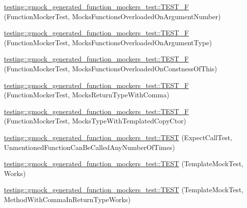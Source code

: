 \begin{DoxyCompactItemize}
\item 
\mbox{\hyperlink{namespacetesting_1_1gmock__generated__function__mockers__test_a23b4f6d7bf9f6b35126ee137aa48ae3b}{testing\+::gmock\+\_\+generated\+\_\+function\+\_\+mockers\+\_\+test\+::\+T\+E\+S\+T\+\_\+F}} (Function\+Mocker\+Test, Mocks\+Functions\+Overloaded\+On\+Argument\+Number)
\item 
\mbox{\hyperlink{namespacetesting_1_1gmock__generated__function__mockers__test_a6fb9a5901e2d2066a9fe5a3d05c0cbe1}{testing\+::gmock\+\_\+generated\+\_\+function\+\_\+mockers\+\_\+test\+::\+T\+E\+S\+T\+\_\+F}} (Function\+Mocker\+Test, Mocks\+Functions\+Overloaded\+On\+Argument\+Type)
\item 
\mbox{\hyperlink{namespacetesting_1_1gmock__generated__function__mockers__test_ad580a4b2f97b3c2643794a627b347511}{testing\+::gmock\+\_\+generated\+\_\+function\+\_\+mockers\+\_\+test\+::\+T\+E\+S\+T\+\_\+F}} (Function\+Mocker\+Test, Mocks\+Functions\+Overloaded\+On\+Constness\+Of\+This)
\item 
\mbox{\hyperlink{namespacetesting_1_1gmock__generated__function__mockers__test_abb74ac8e211661c0d87c902f87002e6d}{testing\+::gmock\+\_\+generated\+\_\+function\+\_\+mockers\+\_\+test\+::\+T\+E\+S\+T\+\_\+F}} (Function\+Mocker\+Test, Mocks\+Return\+Type\+With\+Comma)
\item 
\mbox{\hyperlink{namespacetesting_1_1gmock__generated__function__mockers__test_aa2f918da5d179b4ef678cb803456c7d3}{testing\+::gmock\+\_\+generated\+\_\+function\+\_\+mockers\+\_\+test\+::\+T\+E\+S\+T\+\_\+F}} (Function\+Mocker\+Test, Mocks\+Type\+With\+Templated\+Copy\+Ctor)
\item 
\mbox{\hyperlink{namespacetesting_1_1gmock__generated__function__mockers__test_ae0d5aa8e715f3c183f1ccdcf390187e7}{testing\+::gmock\+\_\+generated\+\_\+function\+\_\+mockers\+\_\+test\+::\+T\+E\+ST}} (Expect\+Call\+Test, Unmentioned\+Function\+Can\+Be\+Called\+Any\+Number\+Of\+Times)
\item 
\mbox{\hyperlink{namespacetesting_1_1gmock__generated__function__mockers__test_a5f59a7b507101fc0dbb558c090974f02}{testing\+::gmock\+\_\+generated\+\_\+function\+\_\+mockers\+\_\+test\+::\+T\+E\+ST}} (Template\+Mock\+Test, Works)
\item 
\mbox{\hyperlink{namespacetesting_1_1gmock__generated__function__mockers__test_aa998c7e5e8b6fd378cacb53663e8c4a6}{testing\+::gmock\+\_\+generated\+\_\+function\+\_\+mockers\+\_\+test\+::\+T\+E\+ST}} (Template\+Mock\+Test, Method\+With\+Comma\+In\+Return\+Type\+Works)
\item 

\end{DoxyCompactItemize}
